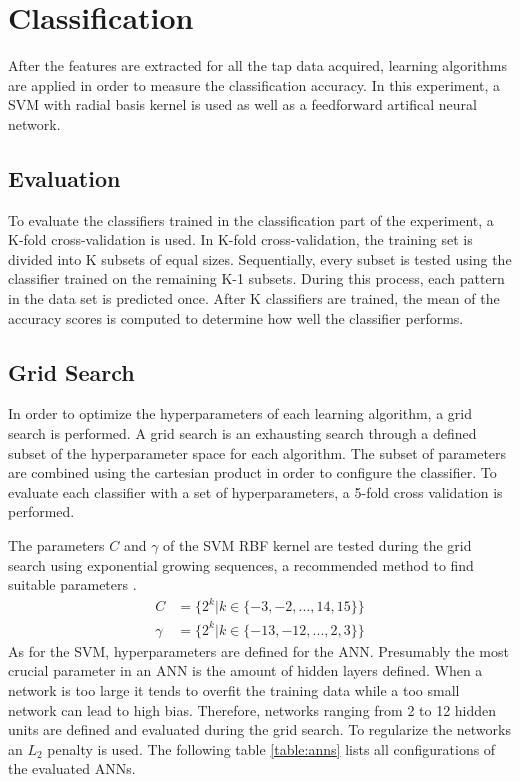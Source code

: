 \section{Classification}
After the features are extracted for all the tap data acquired, learning algorithms are applied in order to measure the classification accuracy. In this experiment, a SVM with radial basis kernel is used as well as a feedforward artifical neural network.

\subsection{Evaluation}
To evaluate the classifiers trained in the classification part of the experiment, a K-fold cross-validation is used. In K-fold cross-validation, the training set is divided into K subsets of equal sizes. Sequentially, every subset is tested using the classifier trained on the remaining K-1 subsets. During this process, each pattern in the data set is predicted once. After K classifiers are trained, the mean of the accuracy scores is computed to determine how well the classifier performs.

\subsection{Grid Search}
In order to optimize the hyperparameters of each learning algorithm, a grid search is performed. A grid search is an exhausting search through a defined subset of the hyperparameter space for each algorithm. The subset of parameters are combined using the cartesian product in order to configure the classifier. To evaluate each classifier with a set of hyperparameters, a 5-fold cross validation is performed.

The parameters $C$ and $\gamma$ of the SVM RBF kernel are tested during the grid search using exponential growing sequences, a recommended method to find suitable parameters \cite{hsu2003practical}.
\begin{align}
  C &= \{ 2^{k} | k \in \{-3, -2, ..., 14, 15\} \}\\ 
  \gamma &= \{ 2^{k} | k \in \{-13, -12, ..., 2, 3\} \}
\end{align}
As for the SVM, hyperparameters are defined for the ANN. Presumably the most crucial parameter in an ANN is the amount of hidden layers defined. When a network is too large it tends to overfit the training data while a too small network can lead to high bias. Therefore, networks ranging from 2 to 12 hidden units are defined and evaluated during the grid search. To regularize the networks an $L_2$ penalty \cite{ng2004feature} is used. The following table \ref{table:anns} lists all configurations of the evaluated ANNs.

